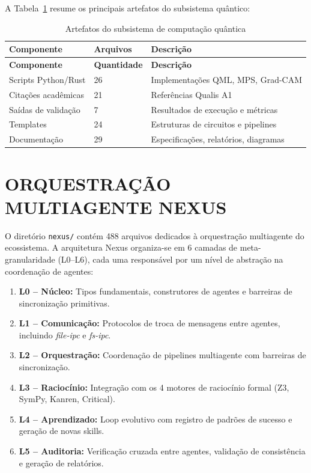 \documentclass[
  brazil,
  sumario=tradicional,
  10pt
]{abntex2}
\begin{document}
A Tabela~\ref{tab:quantum} resume os principais artefatos do
subsistema quântico:

\begin{longtable}{p{4cm}p{3cm}p{5cm}}
  \caption{Artefatos do subsistema de computação quântica}
  \label{tab:quantum}\\
  \toprule
  \textbf{Componente} & \textbf{Arquivos} & \textbf{Descrição} \\
  \midrule
  \endfirsthead
  \toprule
  \textbf{Componente} & \textbf{Quantidade} & \textbf{Descrição} \\
  \midrule
  \endhead
  \bottomrule
  \endfoot
  Scripts Python/Rust & 26 & Implementações QML, MPS, Grad-CAM \\
  Citações acadêmicas & 21 & Referências Qualis A1 \\
  Saídas de validação & 7  & Resultados de execução e métricas \\
  Templates           & 24 & Estruturas de circuitos e pipelines \\
  Documentação        & 29 & Especificações, relatórios, diagramas \\
\end{longtable}

\section{ORQUESTRAÇÃO MULTIAGENTE NEXUS}
\label{sec:nexus}

O diretório \texttt{nexus/} contém 488 arquivos dedicados à
orquestração multiagente do ecossistema. A arquitetura Nexus
organiza-se em 6 camadas de meta-granularidade (L0--L6), cada uma
responsável por um nível de abstração na coordenação de agentes:

\begin{enumerate}
  \item \textbf{L0 -- Núcleo:} Tipos fundamentais, construtores de
    agentes e barreiras de sincronização primitivas.
  \item \textbf{L1 -- Comunicação:} Protocolos de troca de mensagens
    entre agentes, incluindo \textit{file-ipc} e \textit{fs-ipc}.
  \item \textbf{L2 -- Orquestração:} Coordenação de pipelines
    multiagente com barreiras de sincronização.
  \item \textbf{L3 -- Raciocínio:} Integração com os 4 motores de
    raciocínio formal (Z3, SymPy, Kanren, Critical).
  \item \textbf{L4 -- Aprendizado:} Loop evolutivo com registro de
    padrões de sucesso e geração de novas skills.
  \item \textbf{L5 -- Auditoria:} Verificação cruzada entre agentes,
    validação de consistência e geração de relatórios.
\end{enumerate}
\end{document}
